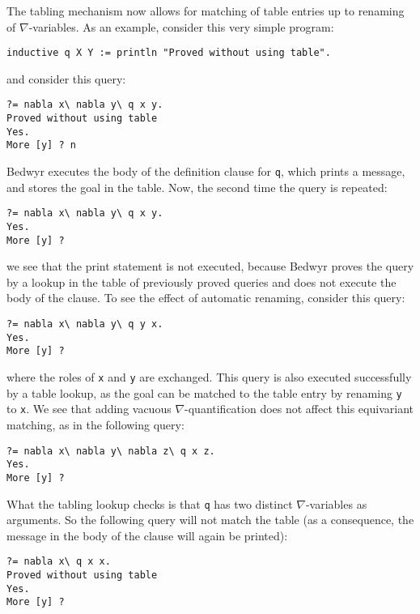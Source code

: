 \documentclass{article}
\newcommand\obj[1]{\texttt{#1}}
\begin{document}
The tabling mechanism now allows for matching of table entries up to renaming
of $\nabla$-variables. 
As an example, consider this very simple program:
\begin{verbatim}
inductive q X Y := println "Proved without using table".
\end{verbatim}
and consider this query:
\begin{verbatim}
?= nabla x\ nabla y\ q x y.
Proved without using table
Yes.
More [y] ? n
\end{verbatim}
Bedwyr executes the body of the definition clause for \obj{q}, 
which prints a message, and stores the goal in the table. 
Now, the second time the query is repeated: 
\begin{verbatim}
?= nabla x\ nabla y\ q x y.
Yes.
More [y] ?
\end{verbatim}
we see that the print statement is not executed, because Bedwyr 
proves the query by a lookup in the table of previously proved queries
and does not execute the body of the clause.
To see the effect of automatic renaming, consider this query:
\begin{verbatim}
?= nabla x\ nabla y\ q y x.
Yes.
More [y] ?
\end{verbatim} 
where the roles of \obj{x} and \obj{y} are exchanged. 
This query is also executed successfully by a table lookup, 
as the goal can be matched to the table entry 
by renaming \obj{y} to \obj{x}.
We see that adding vacuous $\nabla$-quantification 
does not affect this equivariant matching, as in the
following query:
\begin{verbatim}
?= nabla x\ nabla y\ nabla z\ q x z.
Yes.
More [y] ? 
\end{verbatim}
What the tabling lookup checks is that \obj{q} has two distinct
$\nabla$-variables as arguments. So the following query
will not match the table (as a consequence, the message in the body
of the clause will again be printed): 
\begin{verbatim}
?= nabla x\ q x x.
Proved without using table
Yes.
More [y] ?
\end{verbatim}

\end{document}
